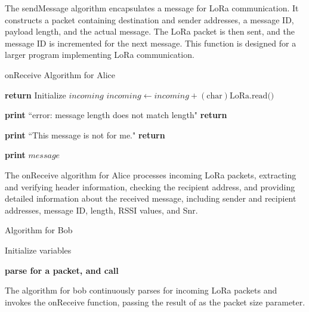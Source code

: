 The sendMessage algorithm encapsulates a message for LoRa communication. It constructs a packet containing destination and sender addresses, a message ID, payload length, and the actual message. The LoRa packet is then sent, and the message ID is incremented for the next message. This function is designed for a larger program implementing LoRa communication.
  \begin{algorithm}[hbt!]
    \caption{onReceive Algorithm for Alice}\label{alg:onReceive}
    \begin{algorithmic}
                \State \textbf{return}
            \EndIf
            \State {}
            \State Initialize $incoming$ 
                \State $incoming \gets incoming + (\text{char})\text{LoRa.read()}$
            \EndWhile
            
                \State \textbf{print} ``error: message length does not match length"
                \State \textbf{return}
            \EndIf
            
                \State \textbf{print} ``This message is not for me."
                \State \textbf{return}
            \EndIf
            
            \State {}
            \State \textbf{print} $message$
        \EndFunction
    \end{algorithmic}
\end{algorithm}
The onReceive algorithm for Alice processes incoming LoRa packets, extracting and verifying header information, checking the recipient address, and providing detailed information about the received message, including sender and recipient addresses, message ID, length, RSSI values, and Snr.
\begin{algorithm}[hbt!]
  \caption{Algorithm for Bob}\label{alg:Bob}
  \begin{algorithmic}
  \State Initialize variables
      
          \State \textbf{parse for a packet, and call} 
      \EndFunction
  \end{algorithmic}
\end{algorithm}
The algorithm for bob continuously parses for incoming LoRa packets and invokes the onReceive function, passing the result of as the packet size parameter.
